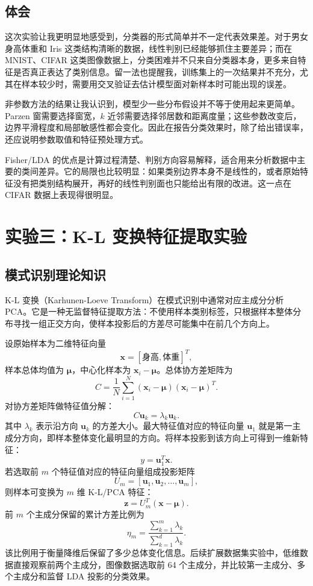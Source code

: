 \documentclass[UTF8,a4paper,12pt]{ctexart}
\begin{document}
\subsection{体会}

这次实验让我更明显地感受到，分类器的形式简单并不一定代表效果差。对于男女身高体重和 Iris 这类结构清晰的数据，线性判别已经能够抓住主要差异；而在 MNIST、CIFAR 这类图像数据上，分类困难并不只来自分类器本身，更多来自特征是否真正表达了类别信息。留一法也提醒我，训练集上的一次结果并不充分，尤其在样本较少时，需要用交叉验证去估计模型面对新样本时可能出现的误差。

非参数方法的结果让我认识到，模型少一些分布假设并不等于使用起来更简单。Parzen 窗需要选择窗宽，$k$ 近邻需要选择邻居数和距离度量；这些参数改变后，边界平滑程度和局部敏感性都会变化。因此在报告分类效果时，除了给出错误率，还应说明参数取值和特征预处理方式。

Fisher/LDA 的优点是计算过程清楚、判别方向容易解释，适合用来分析数据中主要的类间差异。它的局限也比较明显：如果类别边界本身不是线性的，或者原始特征没有把类别结构展开，再好的线性判别面也只能给出有限的改进。这一点在 CIFAR 数据上表现得很明显。
\clearpage
\section{实验三：K-L 变换特征提取实验}

\subsection{模式识别理论知识}

K-L 变换（Karhunen-Loeve Transform）在模式识别中通常对应主成分分析 PCA。它是一种无监督特征提取方法：不使用样本类别标签，只根据样本整体分布寻找一组正交方向，使样本投影后的方差尽可能集中在前几个方向上。

设原始样本为二维特征向量
\[
\boldsymbol{x}=[\text{身高},\text{体重}]^T,
\]
样本总体均值为 $\boldsymbol{\mu}$，中心化样本为 $\boldsymbol{x}_i-\boldsymbol{\mu}$。总体协方差矩阵为
\[
C=\frac{1}{N}\sum_{i=1}^{N}(\boldsymbol{x}_i-\boldsymbol{\mu})(\boldsymbol{x}_i-\boldsymbol{\mu})^T.
\]
对协方差矩阵做特征值分解：
\[
C\boldsymbol{u}_k=\lambda_k\boldsymbol{u}_k.
\]
其中 $\lambda_k$ 表示沿方向 $\boldsymbol{u}_k$ 的方差大小。最大特征值对应的特征向量 $\boldsymbol{u}_1$ 就是第一主成分方向，即样本整体变化最明显的方向。将样本投影到该方向上可得到一维新特征：
\[
y=\boldsymbol{u}_1^T\boldsymbol{x}.
\]
若选取前 $m$ 个特征值对应的特征向量组成投影矩阵
\[
U_m=[\boldsymbol{u}_1,\boldsymbol{u}_2,\ldots,\boldsymbol{u}_m],
\]
则样本可变换为 $m$ 维 K-L/PCA 特征：
\[
\boldsymbol{z}=U_m^T(\boldsymbol{x}-\boldsymbol{\mu}).
\]
前 $m$ 个主成分保留的累计方差比例为
\[
\eta_m=\frac{\sum_{k=1}^{m}\lambda_k}{\sum_{k=1}^{d}\lambda_k}.
\]
该比例用于衡量降维后保留了多少总体变化信息。后续扩展数据集实验中，低维数据直接观察前两个主成分，图像数据选取前 64 个主成分，并比较第一主成分、多个主成分和监督 LDA 投影的分类效果。
\end{document}
